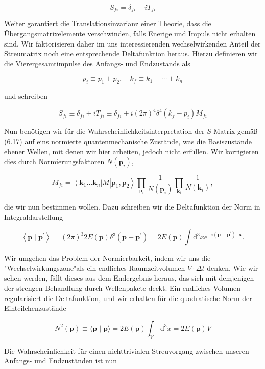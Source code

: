 \documentclass[10pt, letterpaper]{article}
\begin{document}
$$
S_{f i}=\delta_{f i}+i T_{f i}
$$

Weiter garantiert die Translationsinvarianz einer Theorie, dass die Übergangsmatrixelemente verschwinden, falls Enerige und Impuls nicht erhalten sind. Wir faktorisieren daher im uns interessierenden wechselwirkenden Anteil der Streumatrix noch eine entsprechende Deltafunktion heraus. Hierzu definieren wir die Vierergesamtimpulse des Anfangs- und Endzustands als

$$
p_{i} \equiv p_{1}+p_{2}, \quad k_{f} \equiv k_{1}+\cdots+k_{n}
$$

und schreiben

$$
S_{f i} \equiv \delta_{f i}+i T_{f i} \equiv \delta_{f i}+i(2 \pi)^{4} \delta^{4}\left(k_{f}-p_{i}\right) M_{f i}
$$

Nun benötigen wir für die Wahrscheinlichkeitsinterpretation der $S$-Matrix gemäß (6.17) auf eins normierte quantenmechanische Zustände, was die Basiszustände ebener Wellen, mit denen wir hier arbeiten, jedoch nicht erfüllen. Wir korrigieren dies durch Normierungsfaktoren $N\left(\mathbf{p}_{i}\right)$,

$$
M_{f i}=\left\langle\mathbf{k}_{1} \ldots \mathbf{k}_{n}\right| M\left|\mathbf{p}_{1}, \mathbf{p}_{2}\right\rangle \prod_{\mathbf{p}_{i}} \frac{1}{N\left(\mathbf{p}_{i}\right)} \prod_{\mathbf{k}_{i}} \frac{1}{N\left(\mathbf{k}_{i}\right)},
$$

die wir nun bestimmen wollen. Dazu schreiben wir die Deltafunktion der Norm in Integraldarstellung

$$
\left\langle\mathbf{p} \mid \mathbf{p}^{\prime}\right\rangle=(2 \pi)^{3} 2 E(\mathbf{p}) \delta^{3}\left(\mathbf{p}-\mathbf{p}^{\prime}\right)=2 E(\mathbf{p}) \int \mathrm{d}^{3} x e^{-i\left(\mathbf{p}-\mathbf{p}^{\prime}\right) \cdot \mathbf{x}} .
$$

Wir umgehen das Problem der Normierbarkeit, indem wir uns die "Wechselwirkungszone"als ein endliches Raumzeitvolumen $V \cdot \Delta t$ denken. Wie wir sehen werden, fällt dieses aus dem Endergebnis heraus, das sich mit demjenigen der strengen Behandlung durch Wellenpakete deckt. Ein endliches Volumen regularisiert die Deltafunktion, und wir erhalten für die quadratische Norm der Einteilchenzustände

$$
N^{2}(\mathbf{p}) \equiv\langle\mathbf{p} \mid \mathbf{p}\rangle=2 E(\mathbf{p}) \int_{V} \mathrm{~d}^{3} x=2 E(\mathbf{p}) V
$$

Die Wahrscheinlichkeit für einen nichttrivialen Streuvorgang zwischen unseren Anfangs- und Endzuständen ist nun
\end{document}
